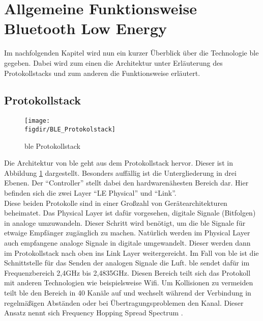 \section{Allgemeine Funktionsweise Bluetooth Low Energy}
\label{s:funktionsweise}

\noindent Im nachfolgenden Kapitel wird nun ein kurzer Überblick über die Technologie \ac{ble} gegeben. Dabei wird zum einen die Architektur unter Erläuterung des Protokollstacks und zum anderen die Funktionsweise erläutert.\\   

\subsection{Protokollstack}
\label{ss:funktionsweise:protokollstack}

\begin{figure}[!b]
	\centering
	\texttt{[image: \\figdir/BLE\_Protokolstack]}
	\caption{\ac{ble} Protokollstack \cite[Seite 16]{Townsend14:GSB}}
	\label{FIG:protokollstack}
\end{figure}

\noindent Die Architektur von \ac{ble} geht aus dem Protokollstack hervor. Dieser ist in Abbildung \ref{FIG:protokollstack} dargestellt. Besonders auffällig ist die Untergliederung in drei Ebenen. Der "`Controller"' stellt dabei den hardwarenähesten Bereich dar. Hier befinden sich die zwei Layer "`LE Physical"' und "`Link"'.\\

\noindent Diese beiden Protokolle sind in einer Großzahl von Gerätearchitekturen beheimatet. Das Physical Layer ist dafür vorgesehen, digitale Signale (Bitfolgen) in analoge umzuwandeln. Dieser Schritt wird benötigt, um die \ac{ble} Signale für etwaige Empfänger zugänglich zu machen. Natürlich werden im Physical Layer auch empfangene analoge Signale in digitale umgewandelt. Dieser werden dann im Protokollstack nach oben ins Link Layer weitergereicht. Im Fall von \ac{ble} ist die Schnittstelle für das Senden der analogen Signale die Luft. \ac{ble} sendet dafür im Frequenzbereich 2,4GHz bis 2,4835GHz. Diesen Bereich teilt sich das Protokoll mit anderen Technologien wie beispielsweise Wifi. Um Kollisionen zu vermeiden teilt \ac{ble} den Bereich in 40 Kanäle auf und wechselt während der Verbindung in regelmäßigen Abständen oder bei Übertragungsproblemen den Kanal. Dieser Ansatz nennt sich Frequency Hopping Spread Spectrum \cite[Seite 16f]{Townsend14:GSB}.\\      

